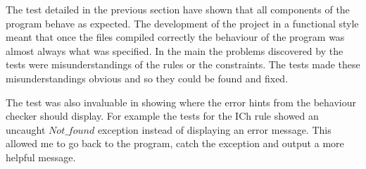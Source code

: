 The test detailed in the previous section have shown that all components of the program behave as expected. The development of the project in a functional style meant that once the files compiled correctly the behaviour of the program was almost always what was specified. In the main the problems discovered by the tests were misunderstandings of the rules or the constraints. The tests made these misunderstandings obvious and so they could be found and fixed. 

The test was also invaluable in showing where the error hints from the behaviour checker should display. For example the tests for the ICh rule showed an uncaught $Not\_found$ exception instead of displaying an error message. This allowed me to go back to the program, catch the exception and output a more helpful message. 

